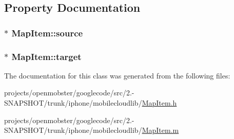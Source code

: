 \subsection{\-Property \-Documentation}
\hypertarget{interface_map_item_ab7b0ad993be44b6bf8485705ac8399b5}{
\subsubsection[{source}]{ $\ast$ \-Map\-Item\-::source}}
\label{interface_map_item_ab7b0ad993be44b6bf8485705ac8399b5}
\hypertarget{interface_map_item_a71584c3e7cbba6e9d17ee819e50ea1e3}{
\subsubsection[{target}]{ $\ast$ \-Map\-Item\-::target}}
\label{interface_map_item_a71584c3e7cbba6e9d17ee819e50ea1e3}


\-The documentation for this class was generated from the following files\-:\begin{DoxyCompactItemize}
\item 
projects/openmobster/googlecode/src/2.-\/\-S\-N\-A\-P\-S\-H\-O\-T/trunk/iphone/mobilecloudlib/\hyperlink{_map_item_8h}{\-Map\-Item.\-h}\item 
projects/openmobster/googlecode/src/2.-\/\-S\-N\-A\-P\-S\-H\-O\-T/trunk/iphone/mobilecloudlib/\hyperlink{_map_item_8m}{\-Map\-Item.\-m}\end{DoxyCompactItemize}
